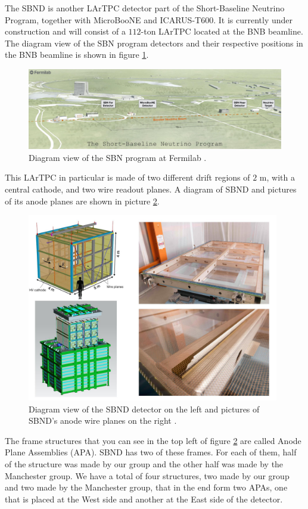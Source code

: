 The SBND is another LArTPC detector part of the Short-Baseline Neutrino Program, together with MicroBooNE and ICARUS-T$600$. It is currently under construction and will consist of a $112$-ton LArTPC located at the BNB beamline. The diagram view of the SBN program detectors and their respective positions in the BNB beamline is shown in figure \ref{fig:sbn}.

\begin{figure}[h!]
    \centering
    \includegraphics[width=115mm]{Figures/sbn.jpg}
    \caption{Diagram view of the SBN program at Fermilab \cite{SBN}.}
    \label{fig:sbn}
\end{figure}

This LArTPC in particular is made of two different drift regions of $2$ m, with a central cathode, and two wire readout planes. A diagram of SBND and pictures of its anode planes are shown in picture \ref{fig:sbnd}. 

\begin{figure}[h!]
    \centering
    \includegraphics[width=110mm]{Figures/sbnd.jpg}
    \caption{Diagram view of the SBND detector on the left and pictures of SBND's anode wire planes on the right \cite{SBN}.}
    \label{fig:sbnd}
\end{figure}

The frame structures that you can see in the top left of figure \ref{fig:sbnd} are called Anode Plane Assemblies (APA). SBND has two of these frames. For each of them, half of the structure was made by our group and the other half was made by the Manchester group. We have a total of four structures, two made by our group and two made by the Manchester group, that in the end  form two APAs, one that is placed at the West side and another at the East side of the detector. 

